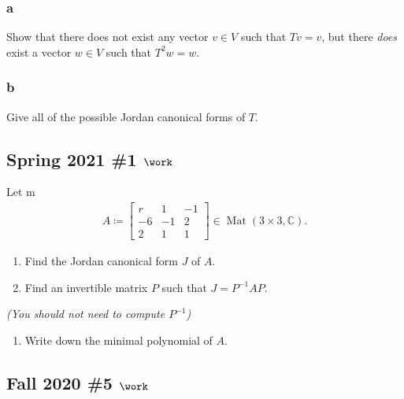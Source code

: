 \hypertarget{a-115}{%
\subsubsection{a}\label{a-115}}

Show that there does not exist any vector \(v\in V\) such that
\(Tv = v\), but there \emph{does} exist a vector \(w\in V\) such that
\(T^2 w= w\).

\hypertarget{b-105}{%
\subsubsection{b}\label{b-105}}

Give all of the possible Jordan canonical forms of \(T\).

\hypertarget{spring-2021-1-work}{%
\subsection{\texorpdfstring{Spring 2021 \#1
\(\work\)}{Spring 2021 \#1 \textbackslash work}}\label{spring-2021-1-work}}

Let m
\begin{align*}
A \coloneqq
\begin{bmatrix}
r & 1 & -1 \\
-6 & -1 & 2 \\
2 & 1 & 1
\end{bmatrix}
\in \operatorname{Mat}(3\times 3, {\mathbb{C}})
.\end{align*}

\begin{enumerate}
\def\labelenumi{\alph{enumi}.}
\item
  Find the Jordan canonical form \(J\) of \(A\).
\item
  Find an invertible matrix \(P\) such that \(J = P ^{-1}A P\).
\end{enumerate}

\emph{(You should not need to compute \(P^{-1}\))}

\begin{enumerate}
\def\labelenumi{\alph{enumi}.}
\setcounter{enumi}{2}
\tightlist
\item
  Write down the minimal polynomial of \(A\).
\end{enumerate}

\hypertarget{fall-2020-5-work}{%
\subsection{\texorpdfstring{Fall 2020 \#5
\(\work\)}{Fall 2020 \#5 \textbackslash work}}\label{fall-2020-5-work}}

